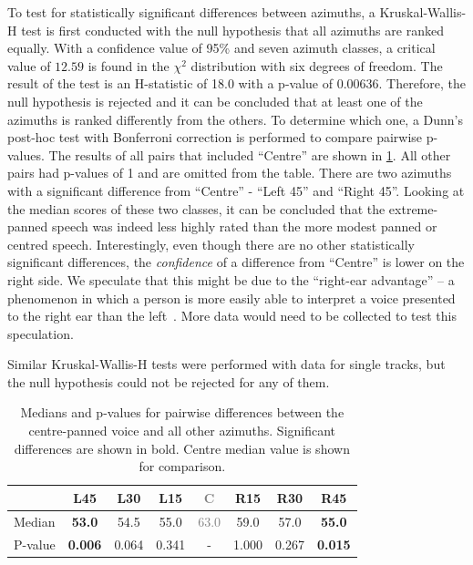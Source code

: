 \documentclass[fleqn]{jaes}
\begin{document}
To test for statistically significant differences between azimuths, a Kruskal-Wallis-H test is first conducted with the null hypothesis that all azimuths are ranked equally. With a confidence value of 95\% and seven azimuth classes, a critical value of $12.59$ is found in the $\chi^2$ distribution with six degrees of freedom. The result of the test is an H-statistic of 18.0 with a p-value of 0.00636. Therefore, the null hypothesis is rejected and it can be concluded that at least one of the azimuths is ranked differently from the others. To determine which one, a Dunn's post-hoc test with Bonferroni correction is performed to compare pairwise p-values. The results of all pairs that included \enquote{Centre} are shown in \cref{table:posthoc}. All other pairs had p-values of 1 and are omitted from the table. There are two azimuths with a significant difference from \enquote{Centre} - \enquote{Left 45} and \enquote{Right 45}. Looking at the median scores of these two classes, it can be concluded that the extreme-panned speech was indeed less highly rated than the more modest panned or centred speech. Interestingly, even though there are no other statistically significant differences, the \textit{confidence} of a difference from \enquote{Centre} is lower on the right side. We speculate that this might be due to the \enquote{right-ear advantage} -- a phenomenon in which a person is more easily able to interpret a voice presented to the right ear than the left~\cite{tanakaNeurophysiologicalEvaluationRightEar2021}. More data would need to be collected to test this speculation.

Similar Kruskal-Wallis-H tests were performed with data for single tracks, but the null hypothesis could not be rejected for any of them.

\begin{table}[htb]
\caption{Medians and p-values for pairwise differences between the centre-panned voice and all other azimuths. Significant differences are shown in bold. Centre median value is shown for comparison.}
\setlength{\tabcolsep}{2.5pt}
\centering
\begin{tabular}{lccccccc}
\toprule
 & \textbf{L45} & L30 & L15 & \textcolor{gray}{C} & R15 & R30 & \textbf{R45} \\
\midrule
Median & \textbf{53.0} & 54.5 & 55.0 & \textcolor{gray}{63.0} & 59.0 & 57.0 & \textbf{55.0} \\
P-value & \textbf{0.006} & 0.064 & 0.341 & - & 1.000 & 0.267 & \textbf{0.015} \\
\bottomrule
\end{tabular}

\label{table:posthoc}
\end{table}
\end{document}
